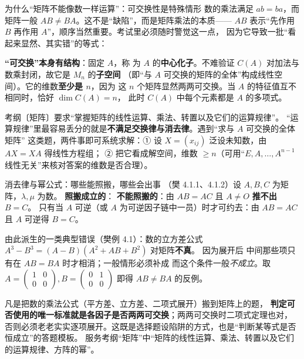 


\begin{fdeep}{为什么“矩阵不能像数一样运算”：可交换性是特殊情形}
数的乘法满足 $ab=ba$，而矩阵一般 $AB\ne BA$。这不是“缺陷”，而是矩阵乘法的本质——
$AB$ 表示“先作用 $B$ 再作用 $A$”，顺序当然重要。考试里必须随时警觉这一点，
因为它导致一批“看起来显然、其实错”的等式：

\medskip
\textbf{“可交换”本身有结构}：固定 $A$，称
为 $A$ 的\textbf{中心化子}。不难验证 $C(A)$ 对加法与数乘封闭，故它是 $M_n$ 的\textbf{子空间}
（即“与 $A$ 可交换的矩阵的全体”构成线性空间）。它的维数\textbf{至少是 $n$}，因为
这 $n$ 个矩阵显然两两可交换。当 $A$ 的特征值互不相同时，恰好 $\dim C(A)=n$，
此时 $C(A)$ 中每个元素都是 $A$ 的多项式。

\fbref{}考纲〔矩阵〕要求“掌握矩阵的线性运算、乘法、转置以及它们的运算规律”。
“运算规律”里最容易丢分的就是\textbf{不满足交换律与消去律}。遇到“求与 $A$ 可交换的全体矩阵”
这类题，两件事即可系统求解：① 设 $X=(x_{ij})$ 泛设未知数，由 $AX=XA$ 得线性方程组；
② 把它看成解空间，维数 $\ge n$（可用“$E,A,\dots,A^{n-1}$ 线性无关”来核对答案的维数是否合理）。
\end{fdeep}

\begin{fdeep}{消去律与幂公式：哪些能照搬，哪些会出事}
（樊 4.1.1、4.1.2）设 $A,B,C$ 为矩阵，$\lambda,\mu$ 为数。
\textbf{照搬成立的}：
\textbf{不能照搬的}：由 $AB=AC$ 且 $A\ne O$ \textbf{推不出} $B=C$。
只有当 $A$ 可逆（或 $A$ 为可逆因子链中一员）时才可约去：由 $AB=AC$ 且 $A$ 可逆得 $B=C$。

由此派生的一类典型错误（樊例 4.1）：数的立方差公式 $A^3-B^3=(A-B)(A^2+AB+B^2)$ 对矩阵\textbf{不真}。
因为展开后
中间那些项只有在 $AB=BA$ 时才相消；一般情形必须补成
而这个条件一般\emph{不成立}。取 $A=\begin{pmatrix}1&0\\0&0\end{pmatrix},
B=\begin{pmatrix}0&1\\0&0\end{pmatrix}$ 即得 $AB\ne BA$ 的反例。

凡是把数的乘法公式（平方差、立方差、二项式展开）搬到矩阵上的题，
\textbf{判定可否使用的唯一标准就是各因子是否两两可交换}；两两可交换时二项式定理也对，
否则必须老老实实逐项展开。这既是选择题设陷阱的方式，也是“判断某等式是否恒成立”的答题模板。
\fbref{}服务考纲“矩阵”中“矩阵的线性运算、乘法、转置以及它们的运算规律、方阵的幂”。
\end{fdeep}

